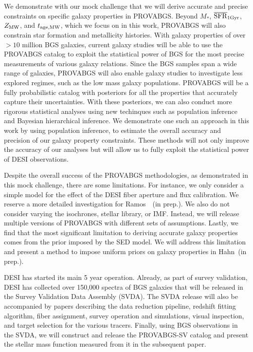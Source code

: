 We demonstrate with our mock challenge that we will derive accurate and precise
constraints on specific galaxy properties in PROVABGS. 
Beyond $M_*$, $\overline{\rm SFR}_{\rm 1Gyr}$, $Z_{\rm MW}$, and $t_{\rm age, MW}$, which we focus on in this work, 
PROVABGS will also constrain star formation and metallicity histories. 
With galaxy properties of over ${>}10$ million BGS galaxies, current galaxy
studies will be able to use the PROVABGS catalog to exploit the statistical
power of BGS for the most precise measurements of various galaxy relations.
Since the BGS samples span a wide range of galaxies, PROVABGS will
also enable galaxy studies to investigate less explored regimes, such as the
low mass galaxy populations. 
PROVABGS will be a fully probabilistic catalog with posteriors for all the
properties that accurately capture their uncertainties.
With these posteriors, we can also conduct more rigorous statistical analyses
using new techinques such as population inference and Bayesian hierarchical
inference.
We demonstrate one such an approach in this work by using population inference,
to estimate the overall accuracy and precision of our galaxy property
constraints. 
These methods will not only improve the accuracy of our analyses but will allow
us to fully exploit the statistical power of DESI observations. 

Despite the overall success of the PROVABGS methodologies, as demonstrated in
this mock challenge, there are some limitations. 
For instance, we only consider a simple model for the effect of the DESI fiber
aperture and flux calibration. 
We reserve a more detailed investigation for Ramos~\etal~(in prep.). 
We also do not consider varying the isochrones, stellar library, or IMF. 
Instead, we will release multiple versions of PROVABGS with different sets of
assumptions. 
Lastly, we find that the most significant limitation to deriving accurate
galaxy properties comes from the prior imposed by the SED model. 
We will address this limitation and present a method to impose uniform priors
on galaxy properties in Hahn~(in prep.). 

DESI has started its main 5 year operation. 
Already, as part of survey validation, DESI has collected over 150,000 spectra
of BGS galaxies that will be released in the Survey Validation Data Assembly
(SVDA). 
The SVDA release will also be accompanied by papers describing the data
reduction pipeline, redshift fitting algorithm, fiber assignment, survey
operation and simulations, visual inspection, and target selection for the
various tracers. 
Finally, using BGS observations in the SVDA, we will construct and release the
PROVABGS-SV catalog and present the stellar mass function measured from it in
the subsequent paper. 
